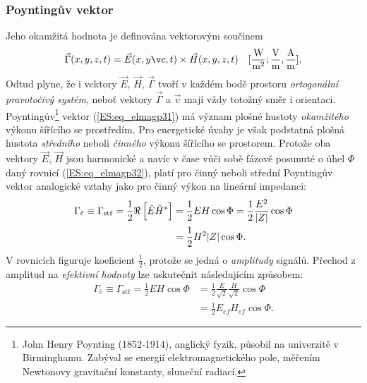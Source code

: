       \subsubsection{Poyntingův vektor}
        Jeho okamžitá hodnota je definována vektorovým součinem
        \begin{equation}\label{ES:eq_elmagp31}
          \vec{\Gamma}(x,y,z,t)=\vec{E}(x,yč,t)\times\vec{H}(x,y,z,t)
          \quad [\si[per-mode=fraction]{\W\per\square\m}; \si[per-mode=fraction]{\V\per\m}, 
                 \si[per-mode=fraction]{\A\per\m}],
        \end{equation}
        Odtud plyne, že i vektory \(\vec{E}\), \(\vec{H}\), \(\vec{\Gamma}\) tvoří v každém bodě 
        prostoru \emph{ortogonální pravotočivý systém}, neboť vektory \(\vec{\Gamma}\) a 
        \(\vec{v}\) mají vždy totožný směr i orientaci. Poyntingův\footnote{John Henry Poynting 
        (1852-1914), anglický fyzik, působil na univerzitě v Birminghamu. Zabýval se energií 
        elektromagnetického pole, měřením Newtonovy gravitační konstanty, sluneční radiací.} 
        vektor (\ref{ES:eq_elmagp31}) má význam plošné hustoty \emph{okamžitého} výkonu šířícího 
        se prostředím. Pro energetické úvahy je však podstatná plošná hustota \emph{středního} 
        neboli \emph{činného} výkonu šířícího se prostorem. Protože oba vektory \(\vec{E}\), 
        \(\vec{H}\) jsou harmonické a navíc v čase vůči sobě fázově posunuté o úhel \(\Phi\) daný 
        rovnicí (\ref{ES:eq_elmagp32}), platí pro činný neboli střední Poyntingův vektor 
        analogické vztahy jako pro činný výkon na lineární impedanci:
        \begin{align}\label{ES:eq_elmagp33}
          \Gamma_\text{č} \equiv \Gamma_\text{stř} 
            = \frac{1}{2}\Re\left[\hat{E}\hat{H}^*\right]
            &= \frac{1}{2}EH\cos\Phi 
            = \frac{1}{2}\frac{E^2}{\lvert Z\rvert}\cos\Phi                  \nonumber \\
            &= \frac{1}{2}H^2\lvert Z\rvert\cos\Phi.
        \end{align}
        V rovnicích figuruje koeficient \(\frac{1}{2}\), protože se jedná o \emph{amplitudy} 
        signálů. Přechod z amplitud na \emph{efektivní hodnoty} lze uskutečnit následujícím 
        způsobem:
        \begin{align}\label{ES:eq_elmagp34}
          \Gamma_\text{č} \equiv \Gamma_\text{stř} 
            = \frac{1}{2}EH\cos\Phi 
            &= \frac{1}{2}\frac{E}{\sqrt{2}}\frac{H}{\sqrt{2}}\cos\Phi   \nonumber \\
            &= \frac{1}{2}E_{ef}H_{ef}\cos\Phi.
        \end{align}
